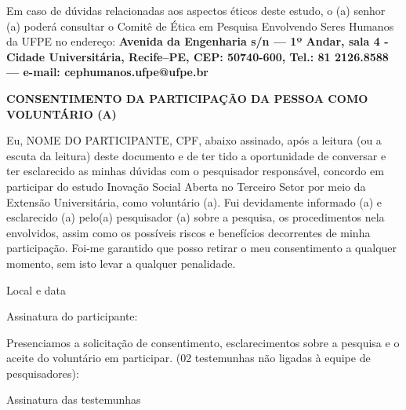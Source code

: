 Em caso de dúvidas relacionadas aos aspectos éticos deste estudo, o (a) senhor (a) poderá consultar o Comitê de Ética em Pesquisa Envolvendo Seres Humanos da UFPE no endereço: \textbf{Avenida da Engenharia s/n — 1º Andar, sala 4 - Cidade Universitária, Recife–PE, CEP: 50740-600, Tel.: 81 2126.8588 — e-mail: cephumanos.ufpe@ufpe.br}
\par\vspace{1\baselineskip}

\textbf{CONSENTIMENTO DA PARTICIPAÇÃO DA PESSOA COMO VOLUNTÁRIO (A)}
\par\vspace{1\baselineskip}

Eu, NOME DO PARTICIPANTE, CPF, abaixo assinado, após a leitura (ou a escuta da leitura) deste documento e de ter tido a oportunidade de conversar e ter esclarecido as minhas dúvidas com o pesquisador responsável, concordo em participar do estudo Inovação Social Aberta no Terceiro Setor por meio da Extensão Universitária, como voluntário (a). Fui devidamente informado (a) e esclarecido (a) pelo(a) pesquisador (a) sobre a pesquisa, os procedimentos nela envolvidos, assim como os possíveis riscos e benefícios decorrentes de minha participação. Foi-me garantido que posso retirar o meu consentimento a qualquer momento, sem isto levar a qualquer penalidade.

Local e data 

Assinatura do participante: 
\par\vspace{1\baselineskip}

Presenciamos a solicitação de consentimento, esclarecimentos sobre a pesquisa e o aceite do voluntário em participar. (02 testemunhas não ligadas à equipe de pesquisadores):

Assinatura das testemunhas